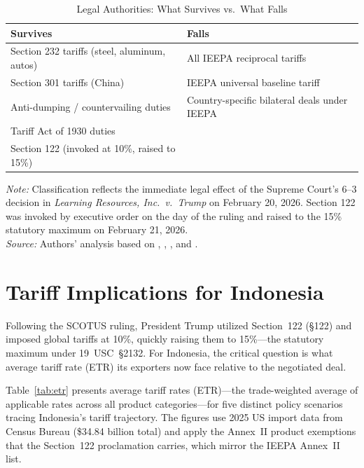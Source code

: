 \documentclass[12pt,a4paper]{article}
\begin{document}
\begin{table}[htbp]
\centering
\caption{Legal Authorities: What Survives vs.\ What Falls}
\begin{tabularx}{\textwidth}{XX}
\toprule
\textbf{Survives} & \textbf{Falls} \\
\midrule
Section 232 tariffs (steel, aluminum, autos) & All IEEPA reciprocal tariffs \\
Section 301 tariffs (China) & IEEPA universal baseline tariff \\
Anti-dumping / countervailing duties & Country-specific bilateral deals under IEEPA \\
Tariff Act of 1930 duties & \\
Section 122 (invoked at 10\%, raised to 15\%) & \\
\bottomrule
\end{tabularx}
\par\smallskip
\begin{minipage}{\linewidth}
\footnotesize
\textit{Note:} Classification reflects the immediate legal effect of the Supreme Court's 6--3 decision in \textit{Learning Resources, Inc.\ v.\ Trump} \cite{scotus2026} on February 20, 2026. Section 122 was invoked by executive order on the day of the ruling and raised to the 15\% statutory maximum on February 21, 2026.\\
\textit{Source:} Authors' analysis based on \cite{scotus2026}, \cite{s122_statute}, \cite{crs_232}, and \cite{crs_122}.
\end{minipage}
\label{tab:legal survive}
\end{table}

\newpage
\section{Tariff Implications for Indonesia}

Following the SCOTUS ruling, President Trump utilized Section~122 (\S122) and imposed global tariffs at 10\%, quickly raising them to 15\%---the statutory maximum under 19~USC~\S2132. For Indonesia, the critical question is what average tariff rate (ETR) its exporters now face relative to the negotiated deal.

Table~\ref{tab:etr} presents average tariff rates (ETR)---the trade-weighted average of applicable rates across all product categories---for five distinct policy scenarios tracing Indonesia's tariff trajectory. The figures use 2025 US import data from Census Bureau (\$34.84 billion total) and apply the Annex~II product exemptions that the Section~122 proclamation carries, which mirror the IEEPA Annex~II list.
\end{document}
